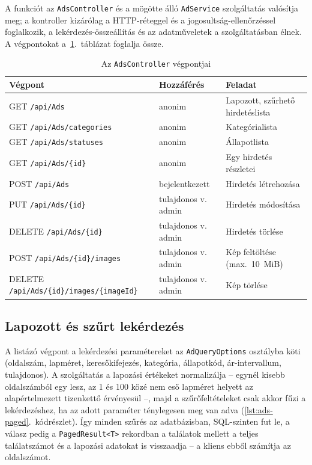 A funkciót az \texttt{AdsController} és a mögötte álló \texttt{AdService} szolgáltatás valósítja
meg; a kontroller kizárólag a HTTP-réteggel és a jogosultság-ellenőrzéssel foglalkozik, a
lekérdezés-összeállítás és az adatműveletek a szolgáltatásban élnek. A végpontokat
a~\ref{tab:ads-endpoints}.~táblázat foglalja össze.

\begin{table}[htbp]
	\centering
	\caption{Az \texttt{AdsController} végpontjai}
	\label{tab:ads-endpoints}
	\begin{tabular}{|l|l|p{5.9cm}|}
		\hline
		\textbf{Végpont} & \textbf{Hozzáférés} & \textbf{Feladat} \\
		\hline
		GET \texttt{/api/Ads} & anonim & Lapozott, szűrhető hirdetéslista \\
		\hline
		GET \texttt{/api/Ads/categories} & anonim & Kategórialista \\
		\hline
		GET \texttt{/api/Ads/statuses} & anonim & Állapotlista \\
		\hline
		GET \texttt{/api/Ads/\{id\}} & anonim & Egy hirdetés részletei \\
		\hline
		POST \texttt{/api/Ads} & bejelentkezett & Hirdetés létrehozása \\
		\hline
		PUT \texttt{/api/Ads/\{id\}} & tulajdonos v. admin & Hirdetés módosítása \\
		\hline
		DELETE \texttt{/api/Ads/\{id\}} & tulajdonos v. admin & Hirdetés törlése \\
		\hline
		POST \texttt{/api/Ads/\{id\}/images} & tulajdonos v. admin & Kép feltöltése (max.\ 10~MiB) \\
		\hline
		DELETE \texttt{/api/Ads/\{id\}/images/\{imageId\}} & tulajdonos v. admin & Kép törlése \\
		\hline
	\end{tabular}
\end{table}

\subsection{Lapozott és szűrt lekérdezés}

A listázó végpont a lekérdezési paramétereket az \texttt{AdQueryOptions} osztályba köti
(oldalszám, lapméret, keresőkifejezés, kategória, állapotkód, ár-intervallum, tulajdonos). A
szolgáltatás a lapozási értékeket normalizálja -- egynél kisebb oldalszámból egy lesz, az 1 és 100
közé nem eső lapméret helyett az alapértelmezett tizenkettő érvényesül --, majd a szűrőfeltételeket
csak akkor fűzi a lekérdezéshez, ha az adott paraméter ténylegesen meg van adva
(\ref{lst:ads-paged}.~kódrészlet). Így minden szűrés az adatbázisban, SQL-szinten fut le, a
válasz pedig a \texttt{PagedResult<T>} rekordban a találatok mellett a teljes találatszámot és a
lapozási adatokat is visszaadja -- a kliens ebből számítja az oldalszámot.

